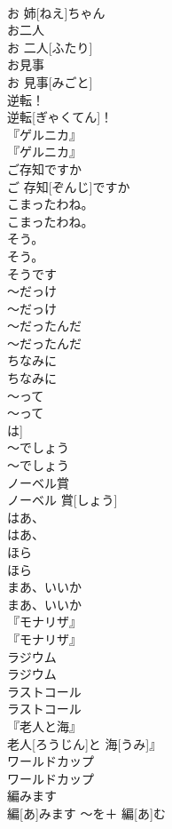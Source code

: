 \documentclass[8pt]{extreport}
\begin{document}
\begin{CJK}{UTF8}{min}
\\	お 姉[ねえ]ちゃん		
\\	お二人	
\\	お 二人[ふたり]		
\\	お見事	
\\	お 見事[みごと]		
\\	逆転！	
\\	逆転[ぎゃくてん]！		
\\	『ゲルニカ』	
\\	『ゲルニカ』		
\\	ご存知ですか	
\\	ご 存知[ぞんじ]ですか		
\\	こまったわね。	
\\	こまったわね。		
\\	そう。	
\\	そう。	
\\	そうです 
\\	〜だっけ	
\\	〜だっけ		
\\	〜だったんだ	
\\	〜だったんだ		
\\	ちなみに	
\\	ちなみに		
\\	〜って	
\\	〜って	
\\	は]	
\\	〜でしょう	
\\	〜でしょう		
\\	ノーベル賞	
\\	ノーベル 賞[しょう]		
\\	はあ、	
\\	はあ、		
\\	ほら	
\\	ほら		
\\	まあ、いいか	
\\	まあ、いいか		
\\	『モナリザ』	
\\	『モナリザ』		
\\	ラジウム	
\\	ラジウム		
\\	ラストコール	
\\	ラストコール		
\\	『老人と海』	
\\	老人[ろうじん]と 海[うみ]』		
\\	ワールドカップ	
\\	ワールドカップ		
\\	編みます	
\\	編[あ]みます	〜を＋ 編[あ]む	

\end{CJK}
\end{document}
